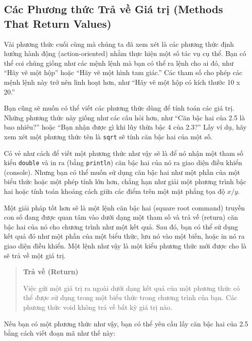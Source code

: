 \subsection{Các Phương thức Trả về Giá trị (Methods That Return
Values)}\label{cuxe1c-phux1b0ux1a1ng-thux1ee9c-trux1ea3-vux1ec1-giuxe1-trux1ecb-methods-that-return-values-1}

Vài phương thức cuối cùng mà chúng ta đã xem xét là các phương thức định
hướng hành động (action-oriented) nhằm thực hiện một số tác vụ cụ thể.
Bạn có thể coi chúng giống như các mệnh lệnh mà bạn có thể ra lệnh cho
ai đó, như ``Hãy vẽ một hộp'' hoặc ``Hãy vẽ một hình tam giác.'' Các
tham số cho phép các mệnh lệnh này trở nên linh hoạt hơn, như ``Hãy vẽ
một hộp có kích thước 10 x 20.''

Bạn cũng sẽ muốn có thể viết các phương thức dùng để tính toán các giá
trị. Những phương thức này giống như các câu hỏi hơn, như ``Căn bậc hai
của 2.5 là bao nhiêu?'' hoặc ``Bạn nhận được gì khi lũy thừa bậc 4 của
2.3?'' Lấy ví dụ, hãy xem xét một phương thức tên là \texttt{sqrt} sẽ
tính căn bậc hai của một số.

Có vẻ như cách để viết một phương thức như vậy sẽ là để nó nhận một tham
số kiểu \texttt{double} và in ra (bằng \texttt{println}) căn bậc hai của
nó ra giao diện điều khiển (console). Nhưng bạn có thể muốn sử dụng căn
bậc hai như một phần của một biểu thức hoặc một phép tính lớn hơn, chẳng
hạn như giải một phương trình bậc hai hoặc tính toán khoảng cách giữa
các điểm trên một mặt phẳng tọa độ \(x/y\).

Một giải pháp tốt hơn sẽ là một lệnh căn bậc hai (square root command)
truyền con số đang được quan tâm vào dưới dạng một tham số và trả về
(return) căn bậc hai của nó cho chương trình như một kết quả. Sau đó,
bạn có thể sử dụng kết quả đó như một phần của một biểu thức, lưu nó vào
một biến, hoặc in nó ra giao diện điều khiển. Một lệnh như vậy là một
kiểu phương thức mới được cho là sẽ trả về một giá trị.

\begin{quote}
\textbf{Trả về (Return)}

Việc gửi một giá trị ra ngoài dưới dạng kết quả của một phương thức có
thể được sử dụng trong một biểu thức trong chương trình của bạn. Các
phương thức void không trả về bất kỳ giá trị nào.
\end{quote}

Nếu bạn có một phương thức như vậy, bạn có thể yêu cầu lấy căn bậc hai
của 2.5 bằng cách viết đoạn mã như thế này:

